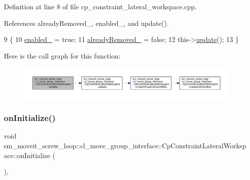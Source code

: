 Definition at line 8 of file cp\+\_\+constraint\+\_\+lateral\+\_\+workspace.\+cpp.



References already\+Removed\+\_\+, enabled\+\_\+, and update().


\begin{DoxyCode}
9         \{
10             \hyperlink{classsm__moveit__screw__loop_1_1cl__move__group__interface_1_1CpConstraintLateralWorkspace_a4f987ccb3af2696d5a543aacaa8e8855}{enabled\_} = \textcolor{keyword}{true};
11             \hyperlink{classsm__moveit__screw__loop_1_1cl__move__group__interface_1_1CpConstraintLateralWorkspace_a95804f1aec34e8471a8c507e5e4af06c}{alreadyRemoved\_} = \textcolor{keyword}{false};
12             this->\hyperlink{classsm__moveit__screw__loop_1_1cl__move__group__interface_1_1CpConstraintLateralWorkspace_a2c742726dc5d521fba7a357dc4ec3dac}{update}();
13         \}
\end{DoxyCode}
Here is the call graph for this function\+:
\nopagebreak
\begin{figure}[H]
\begin{center}
\leavevmode
\includegraphics[width=350pt]{classsm__moveit__screw__loop_1_1cl__move__group__interface_1_1CpConstraintLateralWorkspace_a76aabb89cea41039eab63ead7de92a2b_cgraph}
\end{center}
\end{figure}
\mbox{\label{classsm__moveit__screw__loop_1_1cl__move__group__interface_1_1CpConstraintLateralWorkspace_ab43b6ae4f92d8b5bf498e5538629f26f}} 
\subsubsection{\texorpdfstring{on\+Initialize()}{onInitialize()}}
{\footnotesize\ttfamily void sm\+\_\+moveit\+\_\+screw\+\_\+loop\+::cl\+\_\+move\+\_\+group\+\_\+interface\+::\+Cp\+Constraint\+Lateral\+Workspace\+::on\+Initialize (\begin{DoxyParamCaption}{ }\end{DoxyParamCaption})\hspace{0.3cm}{\ttfamily [override]}, {\ttfamily [virtual]}}



